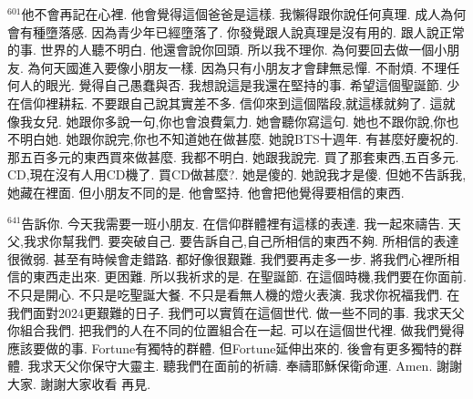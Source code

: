 \documentclass{book}
\begin{document}
$^{601}$他不會再記在心裡.
他會覺得這個爸爸是這樣.
我懶得跟你說任何真理.
成人為何會有種墮落感.
因為青少年已經墮落了.
你發覺跟人說真理是沒有用的.
跟人說正常的事.
世界的人聽不明白.
他還會說你回頭.
所以我不理你.
為何要回去做一個小朋友.
為何天國進入要像小朋友一樣.
因為只有小朋友才會肆無忌憚.
不耐煩.
不理任何人的眼光.
覺得自己愚蠢與否.
我想說這是我還在堅持的事.
希望這個聖誕節.
少在信仰裡耕耘.
不要跟自己說其實差不多.
信仰來到這個階段,就這樣就夠了.
這就像我女兒.
她跟你多說一句,你也會浪費氣力.
她會聽你寫這句.
她也不跟你說,你也不明白她.
她跟你說完,你也不知道她在做甚麼.
她說BTS十週年.
有甚麼好慶祝的.
那五百多元的東西買來做甚麼.
我都不明白.
她跟我說完.
買了那套東西,五百多元.
CD,現在沒有人用CD機了.
買CD做甚麼?.
她是傻的.
她說我才是傻.
但她不告訴我,她藏在裡面.
但小朋友不同的是.
他會堅持.
他會把他覺得要相信的東西.

$^{641}$告訴你.
今天我需要一班小朋友.
在信仰群體裡有這樣的表達.
我一起來禱告.
天父,我求你幫我們.
要突破自己.
要告訴自己,自己所相信的東西不夠.
所相信的表達很微弱.
甚至有時候會走錯路.
都好像很艱難.
我們要再走多一步.
將我們心裡所相信的東西走出來.
更困難.
所以我祈求的是.
在聖誕節.
在這個時機,我們要在你面前.
不只是開心.
不只是吃聖誕大餐.
不只是看無人機的燈火表演.
我求你祝福我們.
在我們面對2024更艱難的日子.
我們可以實質在這個世代.
做一些不同的事.
我求天父你組合我們.
把我們的人在不同的位置組合在一起.
可以在這個世代裡.
做我們覺得應該要做的事.
Fortune有獨特的群體.
但Fortune延伸出來的.
後會有更多獨特的群體.
我求天父你保守大靈主.
聽我們在面前的祈禱.
奉禱耶穌保衛命運.
Amen.
謝謝大家.
謝謝大家收看 再見.
\newpage
\end{document}
